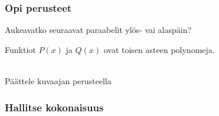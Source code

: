 \begin{tehtavasivu}

\subsubsection*{Opi perusteet}

\begin{tehtava}
  Aukeavatko seuraavat paraabelit ylös- vai alaspäin? %
  \begin{alakohdat}
  \end{alakohdat}

  \begin{vastaus}
    \begin{alakohdat}
    \end{alakohdat}
  \end{vastaus}
\end{tehtava}

\begin{tehtava}
Funktiot $P(x)$ ja $Q(x)$ ovat toisen asteen polynomeja.\\
\begin{kuvaajapohja}{1}{-2}{3}{-1}{3}
\end{kuvaajapohja} \\
Päättele kuvaajan perusteella
\begin{alakohdat}
\end{alakohdat}

\begin{vastaus}
\begin{alakohdat}
\end{alakohdat}
\end{vastaus}
\end{tehtava}

\subsubsection*{Hallitse kokonaisuus}


\end{tehtavasivu}
